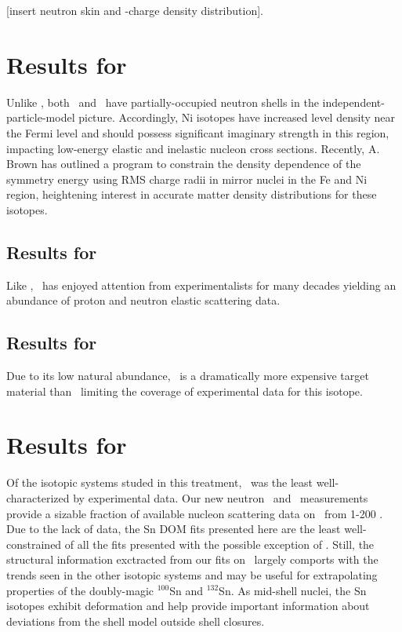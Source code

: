 [insert neutron skin and \neEight-\oEight charge density distribution].

\section{Results for \niEightFour}
Unlike \caAughtEight, both \niEight\ and \niFour\ have partially-occupied neutron shells in the
independent-particle-model picture. Accordingly, Ni isotopes have increased level density near the
Fermi level and should possess significant imaginary strength in this region, impacting
low-energy elastic and inelastic nucleon cross sections. Recently, A. Brown has outlined a
program to constrain the density dependence of the symmetry energy using RMS charge radii in mirror
nuclei in the Fe and Ni region, heightening interest in accurate
matter density distributions for these isotopes.
\subsection{Results for \niEight}
Like \caForty, \niEight\ has enjoyed attention from experimentalists for many decades yielding
an abundance of proton and neutron elastic scattering data.
\subsection{Results for \niFour}
Due to its low natural abundance, \niFour\ is a dramatically more expensive target material than
\niEight\, limiting the coverage of experimental data for this isotope.

\section{Results for \snTwelveFour}
Of the isotopic systems studed in this treatment, \snTwelveFour\ was the least well-characterized by
experimental data. Our new neutron \tot\ and \el\ measurements provide a sizable fraction
of available nucleon scattering data on \snTwelveFour\ from 1-200 \mega\electronvolt. Due to the
lack of data, the Sn DOM fits presented here are the least well-constrained of all the fits
presented with the possible exception of \niFour. Still, the structural information exctracted from
our fits on \snTwelveFour\ largely comports with the trends seen in the other isotopic systems and
may be useful for extrapolating properties of the doubly-magic $^{100}$Sn and $^{132}$Sn. As
mid-shell nuclei, the Sn isotopes exhibit deformation and help provide important information
about deviations from the shell model outside shell closures. 
